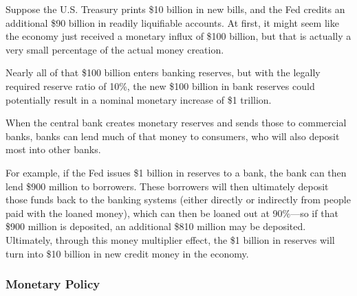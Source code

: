 \documentclass{article}
\begin{document}
      \begin{definition}
        Suppose the U.S. Treasury prints \$10 billion in new bills, and the Fed credits an additional \$90 billion in readily liquifiable accounts. At first, it might seem like the economy just received a monetary influx of \$100 billion, but that is actually a very small percentage of the actual money creation. 

        Nearly all of that \$100 billion enters banking reserves, but with the legally required reserve ratio of 10\%, the new \$100 billion in bank reserves could potentially result in a nominal monetary increase of \$1 trillion. 
      \end{definition}

      \begin{definition}
        When the central bank creates monetary reserves and sends those to commercial banks, banks can lend much of that money to consumers, who will also deposit most into other banks. 
      \end{definition}

      \begin{example}
        For example, if the Fed issues \$1 billion in reserves to a bank, the bank can then lend \$900 million to borrowers. These borrowers will then ultimately deposit those funds back to the banking systems (either directly or indirectly from people paid with the loaned money), which can then be loaned out at 90\%—so if that \$900 million is deposited, an additional \$810 million may be deposited. Ultimately, through this money multiplier effect, the \$1 billion in reserves will turn into \$10 billion in new credit money in the economy.
      \end{example}

    \subsubsection{Monetary Policy}
\end{document}
